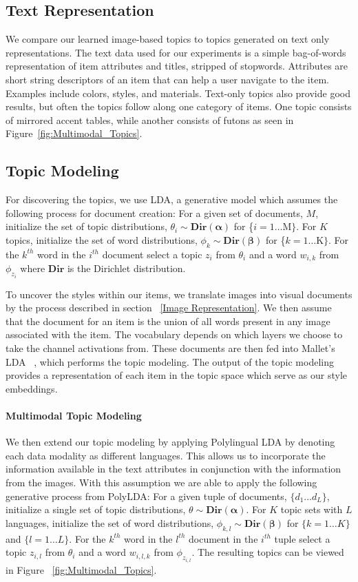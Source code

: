 \documentclass[10pt,twocolumn,letterpaper]{article}
\begin{document}
\subsection{Text Representation}
\label{text}
We compare our learned image-based topics to topics generated on text only representations. The text data used for our experiments is a simple bag-of-words representation of item attributes and titles, stripped of stopwords. Attributes are short string descriptors of an item that can help a user navigate to the item. Examples include colors, styles, and materials. Text-only topics also provide good results, but often the topics follow along one category of items. One topic consists of mirrored accent tables, while another consists of futons as seen in Figure~\ref{fig:Multimodal_Topics}.

\subsection{Topic Modeling}
\label{lda}
For discovering the topics, we use LDA, a generative model which assumes the following process for document creation: For a given set of documents, $M$, initialize the set of topic distributions, $\theta_i \sim \mathbf{Dir(\alpha)}$ for \{$i=1\dots $M$\}$. For $K$ topics, initialize the set of word distributions, ${\phi_k} \sim \mathbf{Dir(\beta)}$  for \{$k=1\dots $K$\}$. For the $k^{th}$ word in the $i^{th}$ document select a topic ${z_i}$ from  $\theta_i$ and a word ${w_{i,k}}$ from ${\phi_{z_i}}$ where $\mathbf{Dir}$ is the Dirichlet distribution.

To uncover the styles within our items, we translate images into visual documents by the process described in section ~\ref{Image Representation}. We then assume that the document for an item is the union of all words present in any image associated with the item. The vocabulary depends on which layers we choose to take the channel activations from. These documents are then fed into Mallet's LDA ~\cite{McCallumMALLET}, which performs the topic modeling. The output of the topic modeling provides a representation of each item in the topic space which serve as our style embeddings.

\paragraph{Multimodal Topic Modeling}
We then extend our topic modeling by applying Polylingual LDA by denoting each data modality as different languages. This allows us to incorporate the information available in the text attributes in conjunction with the information from the images. With this assumption we are able to apply the following generative process from PolyLDA: For a given tuple of documents, $\{d_1\dots d_L\}$, initialize a single set of topic distributions, $\theta \sim \mathbf{Dir(\alpha)}$. For $K$ topic sets with $L$ languages, initialize the set of word distributions, ${\phi_{k,l}} \sim \mathbf{Dir(\beta)}$  for $\{k=1\dots K\}$ and $\{l=1\dots L\}$. For the $k^{th}$ word in the $l^{th}$ document in the $i^{th}$ tuple select a topic ${z_{i,l}}$ from  $\theta_i$ and a word ${w_{i,l,k}}$ from ${\phi_{z_{i,l}}}$. The resulting topics can be viewed in Figure ~\ref{fig:Multimodal_Topics}.
\end{document}
